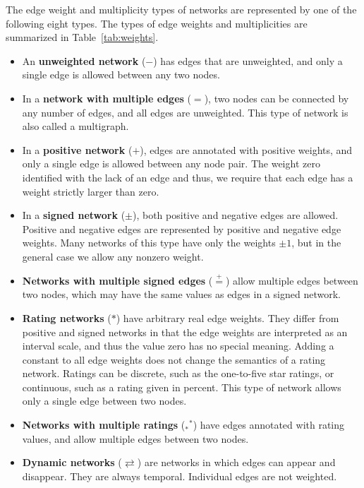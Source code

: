 \documentclass{article}
\begin{document}
The edge weight and multiplicity types of networks are represented by
one of the following eight types. 
The types of edge weights and multiplicities are summarized in
Table~\ref{tab:weights}. 
\begin{itemize}
\item An \textbf{unweighted network} ($-$) 
  has edges that are
  unweighted, and only a 
  single edge is allowed between any two nodes.  
\item In a \textbf{network with multiple edges} ($=$), 
  two nodes can be
  connected by any number of edges, and all edges are unweighted. This
  type of network is also called a multigraph.  
\item In a \textbf{positive network} ($+$), 
  edges are annotated
  with positive weights, and only a single edge is allowed between
  any node pair.  The weight zero identified with the lack of an edge
  and thus, we require that each edge has a weight strictly larger than
  zero. 
\item In a \textbf{signed network} ($\pm$), 
  both positive and negative
  edges are 
  allowed. Positive and negative edges are represented by positive and
  negative edge weights. Many networks of this type have only the
  weights $\pm 1$, but in the general case we allow any nonzero weight.
\item \textbf{Networks with multiple signed edges} ($\stackrel{+}{=}$) 
  allow multiple edges between two nodes, which may have the same values
  as edges in a signed network.
\item \textbf{Rating networks} ($*$) 
  have arbitrary real edge weights.  They
  differ from positive and signed networks in that the edge weights are
  interpreted as an interval scale, and thus the value zero has no
  special meaning.  Adding a constant to all edge weights does not
  change the semantics of a rating network. 
  Ratings can be discrete, such as the one-to-five star ratings, or
  continuous, such as a rating given in percent. 
  This type of network allows only a single edge between two nodes. 
\item \textbf{Networks with multiple ratings} ($_*{}^*$) 
  have edges annotated
  with rating values, and allow multiple edges between two nodes.
\item \textbf{Dynamic networks} ($\rightleftarrows$) are networks in
  which edges can appear and disappear.  They are always
  temporal. Individual edges are not weighted. 
\end{itemize}
\end{document}
